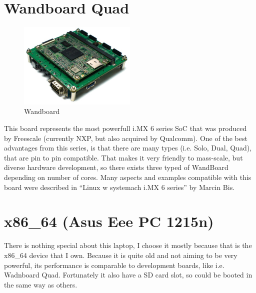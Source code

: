 \documentclass[printmode]{mgr}
\begin{document}
\section{Wandboard Quad}

\begin{figure}[htbp]
  \centering
    \includegraphics[width=0.5\textwidth]{wandboard-front.jpg}
  \caption{Wandboard}
  \label{fig:devboard-wandboard}
\end{figure}

This board represents the most powerfull i.MX 6 series SoC that was produced by Freescale (currently NXP, but also acquired by Qualcomm).
One of the best advantages from this series, is that there are many types (i.e. Solo, Dual, Quad), that are pin to pin compatible.
That makes it very friendly to mass-scale, but diverse hardware development, so there exists three typed of WandBoard depending on number of cores.
Many aspects and examples compatible with this board were described in ``Linux w systemach i.MX 6 series'' by Marcin Bis.\cite{book:lws-imx6}


\section{x86\_64 (Asus Eee PC 1215n)}

There is nothing special about this laptop, I choose it mostly because that is the x86\_64 device that I own. Because it is quite old and not aiming to be very powerful, its performance is comparable to development boards, like i.e. Wadnboard Quad. Fortunately it also have a SD card slot, so could be booted in the same way as others.
\end{document}
